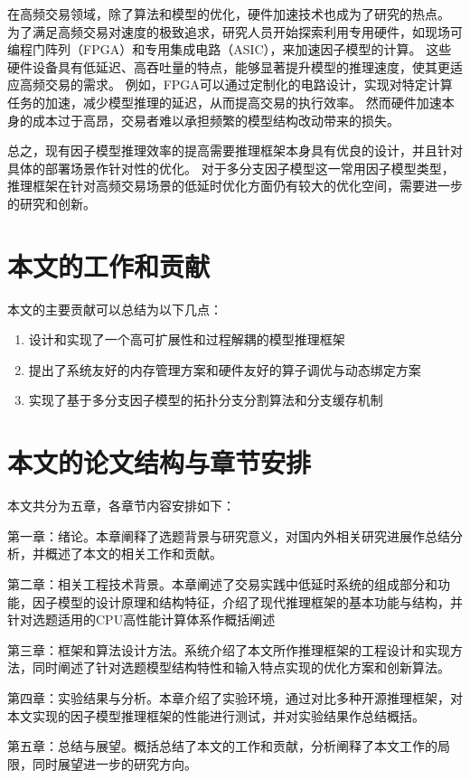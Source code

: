 在高频交易领域，除了算法和模型的优化，硬件加速技术也成为了研究的热点。
为了满足高频交易对速度的极致追求，研究人员开始探索利用专用硬件，如现场可编程门阵列（FPGA）和专用集成电路（ASIC），来加速因子模型的计算。
这些硬件设备具有低延迟、高吞吐量的特点，能够显著提升模型的推理速度，使其更适应高频交易的需求。
例如，FPGA可以通过定制化的电路设计，实现对特定计算任务的加速，减少模型推理的延迟，从而提高交易的执行效率\cite{ALI20241}。
然而硬件加速本身的成本过于高昂，交易者难以承担频繁的模型结构改动带来的损失。

总之，现有因子模型推理效率的提高需要推理框架本身具有优良的设计，并且针对具体的部署场景作针对性的优化。
对于多分支因子模型这一常用因子模型类型，推理框架在针对高频交易场景的低延时优化方面仍有较大的优化空间，需要进一步的研究和创新。

\section{本文的工作和贡献}

本文的主要贡献可以总结为以下几点：
\begin{enumerate}
\item 设计和实现了一个高可扩展性和过程解耦的模型推理框架
\item 提出了系统友好的内存管理方案和硬件友好的算子调优与动态绑定方案
\item 实现了基于多分支因子模型的拓扑分支分割算法和分支缓存机制
\end{enumerate}

\section{本文的论文结构与章节安排}

\label{sec:arrangement}

本文共分为五章，各章节内容安排如下：

第一章：绪论。本章阐释了选题背景与研究意义，对国内外相关研究进展作总结分析，并概述了本文的相关工作和贡献。

第二章：相关工程技术背景。本章阐述了交易实践中低延时系统的组成部分和功能，因子模型的设计原理和结构特征，介绍了现代推理框架的基本功能与结构，并针对选题适用的CPU高性能计算体系作概括阐述

第三章：框架和算法设计方法。系统介绍了本文所作推理框架的工程设计和实现方法，同时阐述了针对选题模型结构特性和输入特点实现的优化方案和创新算法。  

第四章：实验结果与分析。本章介绍了实验环境，通过对比多种开源推理框架，对本文实现的因子模型推理框架的性能进行测试，并对实验结果作总结概括。

第五章：总结与展望。概括总结了本文的工作和贡献，分析阐释了本文工作的局限，同时展望进一步的研究方向。
